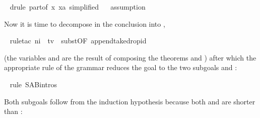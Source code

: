 \begin{isabellebody}
\begin{isamarkuptxt}
\end{isamarkuptxt}%
\isamarkuptrue%
\ \isamarkupfalse%
{}drule\ part{}{}of\ {}{}x{}\ x{}a{}{}\ simplified{}{}\isanewline
\ \ \isamarkupfalse%
{}assumption{}%
\begin{isamarkuptxt}%
\noindent
Now it is time to decompose  in the conclusion 
into ,%
\end{isamarkuptxt}%
\isamarkuptrue%
\ \isamarkupfalse%
{}rule{}tac\ n{}{}i\ \ t{}v\ \ subst{}OF\ append{}take{}drop{}id{}{}%
\begin{isamarkuptxt}%
\noindent
(the variables  and  are the result of composing the
theorems  and )
after which the appropriate rule of the grammar reduces the goal
to the two subgoals  and :%
\end{isamarkuptxt}%
\isamarkuptrue%
\ \isamarkupfalse%
{}rule\ S{}A{}B{}intros{}%
\begin{isamarkuptxt}%
Both subgoals follow from the induction hypothesis because both  and  are shorter than :%
\end{isamarkuptxt}%
\isamarkuptrue%

\end{isabellebody}
